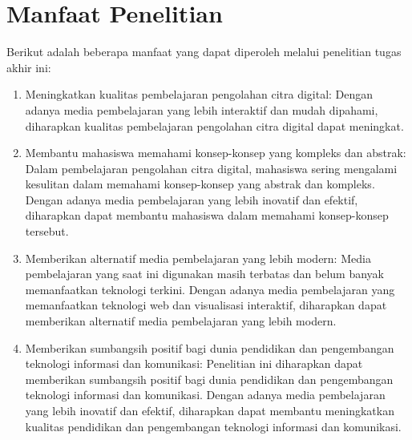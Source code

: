 \section{Manfaat Penelitian}
Berikut adalah beberapa manfaat yang dapat diperoleh melalui penelitian tugas akhir ini:
\begin{enumerate}
    \item Meningkatkan kualitas pembelajaran pengolahan citra digital: Dengan adanya media pembelajaran yang lebih interaktif dan mudah dipahami, diharapkan kualitas pembelajaran pengolahan citra digital dapat meningkat.
    \item Membantu mahasiswa memahami konsep-konsep yang kompleks dan abstrak: Dalam pembelajaran pengolahan citra digital, mahasiswa sering mengalami kesulitan dalam memahami konsep-konsep yang abstrak dan kompleks. Dengan adanya media pembelajaran yang lebih inovatif dan efektif, diharapkan dapat membantu mahasiswa dalam memahami konsep-konsep tersebut.
    \item Memberikan alternatif media pembelajaran yang lebih modern: Media pembelajaran yang saat ini digunakan masih terbatas dan belum banyak memanfaatkan teknologi terkini. Dengan adanya media pembelajaran yang memanfaatkan teknologi web dan visualisasi interaktif, diharapkan dapat memberikan alternatif media pembelajaran yang lebih modern.
    \item Memberikan sumbangsih positif bagi dunia pendidikan dan pengembangan teknologi informasi dan komunikasi: Penelitian ini diharapkan dapat memberikan sumbangsih positif bagi dunia pendidikan dan pengembangan teknologi informasi dan komunikasi. Dengan adanya media pembelajaran yang lebih inovatif dan efektif, diharapkan dapat membantu meningkatkan kualitas pendidikan dan pengembangan teknologi informasi dan komunikasi.
\end{enumerate}

